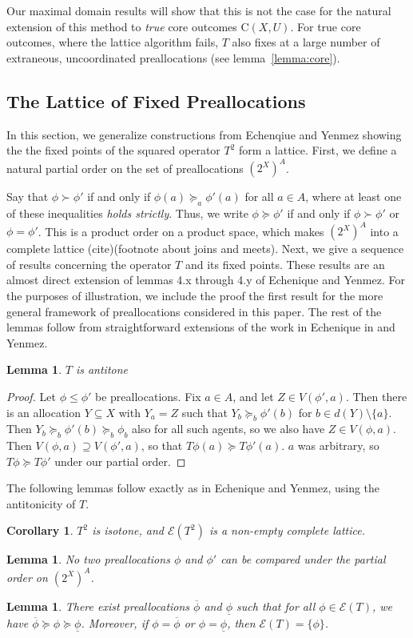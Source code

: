 \documentclass[11pt,reqno]{amsart}
\newtheorem{lemma}[thm]{Lemma}
\newtheorem{cor}[thm]{Corollary}
\theoremstyle{definition}
\numberwithin{equation}{section}
\newcommand{\prf}{\begin{proof}}
\newcommand{\eprf}{\end{proof}}
\newcommand{\ol}{\overline}
\newcommand{\ul}{\underline}
\newcommand{\pre}{\phi}
\newcommand{\prealloc}{(2^X)^A}
\newcommand{\sub}{\subseteq}
\newcommand{\core}{\mathrm{C}(X,U)}
\newcommand{\fix}{\mathcal{E}}
\newcommand{\suq}{\succeq}
\newcommand{\su}{\succ}
\begin{document}
Our maximal domain results will show that this is not the case for the natural extension of this method to \emph{true} core outcomes $\core$.
For true core outcomes, where the lattice algorithm fails, $T$ also fixes at a large number of extraneous, uncoordinated preallocations (see lemma~\ref{lemma:core}). 

\subsection{The Lattice of Fixed Preallocations}
In this section, we generalize constructions from Echenqiue and Yenmez showing the the fixed points of the squared operator $T^2$ form a lattice. 
First, we define a natural partial order on the set of preallocations $\prealloc$.

Say that $\pre \su \pre'$ if and only if $\pre(a) \suq_a \pre'(a)$ for all $a \in A$, where at least one of these inequalities \emph{holds strictly}. 
Thus, we write $\pre \suq \pre'$ if and only if $\pre \su \pre'$ or $\pre = \pre'$. 
This is a product order on a product space, which makes $\prealloc$ into a complete lattice (cite)(footnote about joins and meets). 
Next, we give a sequence of results concerning the operator $T$ and its fixed points. 
These results are an almost direct extension of lemmas 4.x through 4.y of Echenique and Yenmez.
For the purposes of illustration, we include the proof the first result for the more general framework of preallocations considered in this paper.
The rest of the lemmas follow from straightforward extensions of the work in Echenique in and Yenmez. 
\begin{lemma} \label{lemma:antitone}
$T$ is antitone 
\end{lemma}
\prf
Let $\pre \leq \pre'$ be preallocations.
Fix $a \in A$, and let $Z \in V(\pre',a)$.
Then there is an allocation $Y \sub X$ with $Y_a = Z$ such that $Y_b \suq_b \pre'(b)$ for $b \in d(Y) \setminus \{a\}$.
Then $Y_b \suq_b \pre'(b) \suq_b \pre_b$ also for all such agents, so we also have $Z \in V(\pre,a)$.
Then $V(\pre,a) \supseteq V(\pre',a)$, so that $T\pre(a) \suq T\pre'(a)$. $a$ was arbitrary, so $T\pre \suq T\pre'$ under our partial order. 
\eprf
The following lemmas follow exactly as in Echenique and Yenmez, using the antitonicity of $T$. 
\begin{cor} $T^2$ is isotone, and $\fix(T^2)$ is a non-empty complete lattice. 
\end{cor}
\begin{lemma} \label{lemma:order}
No two preallocations $\pre$ and $\pre'$ can be compared under the partial order on $\prealloc$.
\end{lemma}
\begin{lemma} \label{lemma:top}
There exist preallocations $\ol{\pre}$ and $\ul{\pre}$ such that for all $\pre \in \fix(T)$, we have $\ol{\pre} \suq \pre \suq \ul{\pre}$. Moreover, if $\pre = \ol{\pre}$ or $\pre = \ul{\pre}$, then $\fix(T) = \{\pre\}$. 
\end{lemma}
\end{document}

